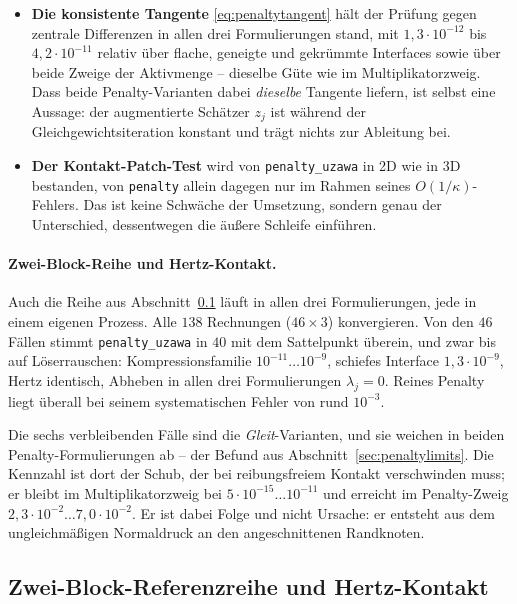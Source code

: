 \documentclass[a4paper,11pt]{article}
\newcommand{\code}[1]{\texttt{\small #1}}
\begin{document}
\begin{itemize}\itemsep2pt
  \item \textbf{Die konsistente Tangente} \eqref{eq:penaltytangent} hält der Prüfung gegen
        zentrale Differenzen in allen drei Formulierungen stand, mit
        $1{,}3\cdot10^{-12}$ bis $4{,}2\cdot10^{-11}$ relativ über flache, geneigte und gekrümmte
        Interfaces sowie über beide Zweige der Aktivmenge -- dieselbe Güte wie im
        Multiplikatorzweig. Dass beide Penalty-Varianten dabei \emph{dieselbe} Tangente liefern,
        ist selbst eine Aussage: der augmentierte Schätzer $z_j$ ist während der
        Gleichgewichtsiteration konstant und trägt nichts zur Ableitung bei.
  \item \textbf{Der Kontakt-Patch-Test} wird von \code{penalty\_uzawa} in 2D wie in 3D bestanden,
        von \code{penalty} allein dagegen nur im Rahmen seines $O(1/\kappa)$-Fehlers. Das ist
        keine Schwäche der Umsetzung, sondern genau der Unterschied, dessentwegen
        \citet{puso2008} die äußere Schleife einführen.
\end{itemize}

\paragraph{Zwei-Block-Reihe und Hertz-Kontakt.} Auch die Reihe aus
Abschnitt~\ref{sec:controltests} läuft in allen drei Formulierungen, jede in einem eigenen
Prozess. Alle $138$ Rechnungen ($46\times3$) konvergieren. Von den $46$ Fällen stimmt
\code{penalty\_uzawa} in $40$ mit dem Sattelpunkt überein, und zwar bis auf Löserrauschen:
Kompressionsfamilie $10^{-11}\ldots10^{-9}$, schiefes Interface $1{,}3\cdot10^{-9}$, Hertz
identisch, Abheben in allen drei Formulierungen $\lambda_j=0$. Reines Penalty liegt überall bei
seinem systematischen Fehler von rund $10^{-3}$.

Die sechs verbleibenden Fälle sind die \emph{Gleit}-Varianten, und sie weichen in beiden
Penalty-Formulierungen ab -- der Befund aus Abschnitt~\ref{sec:penaltylimits}. Die Kennzahl ist
dort der Schub, der bei reibungsfreiem Kontakt verschwinden muss; er bleibt im Multiplikatorzweig
bei $5\cdot10^{-15}\ldots10^{-11}$ und erreicht im Penalty-Zweig
$2{,}3\cdot10^{-2}\ldots7{,}0\cdot10^{-2}$. Er ist dabei Folge und nicht Ursache: er entsteht aus
dem ungleichmäßigen Normaldruck an den angeschnittenen Randknoten.

\subsection{Zwei-Block-Referenzreihe und Hertz-Kontakt}
\label{sec:controltests}
\end{document}
